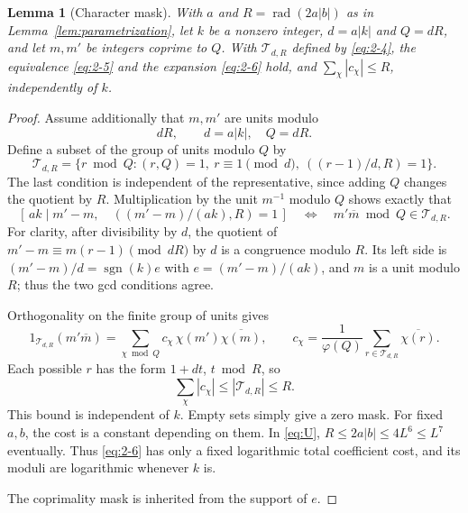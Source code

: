 \documentclass[11pt]{article}
\newtheorem{lemma}[theorem]{Lemma}
\theoremstyle{definition}
\theoremstyle{definition}
\begin{document}
\begin{lemma}[Character mask]\label{lem:mask}
With \(a\) and \(R=\operatorname{rad}(2a|b|)\) as in Lemma~\ref{lem:parametrization}, let \(k\) be a nonzero integer, \(d=a|k|\) and \(Q=dR\), and let \(m,m'\) be integers coprime to \(Q\). With \(\mathcal T_{d,R}\) defined by \eqref{eq:2-4}, the equivalence \eqref{eq:2-5} and the expansion \eqref{eq:2-6} hold, and \(\sum_\chi|c_\chi|\le R\), independently of \(k\).
\end{lemma}
\begin{proof}
Assume additionally that \(m,m'\) are units modulo
\begin{equation*}
dR,\qquad d=a|k|,\quad Q=dR.
\end{equation*}
Define a subset of the group of units modulo \(Q\) by
\begin{equation}
\mathcal T_{d,R}=
 \{r\bmod Q:(r,Q)=1,\ r\equiv1\pmod d,\
                  ((r-1)/d,R)=1\}.                    \tag{2.4}\label{eq:2-4}
\end{equation}
The last condition is independent of the representative, since adding \(Q\) changes the quotient by \(R\). Multiplication by the unit \(m^{-1}\) modulo \(Q\) shows exactly that
\stepcounter{equation}
\begin{equation}
\left[\,ak\mid m'-m,\quad
             \left((m'-m)/(ak),R\right)=1\,\right]
 \quad\Longleftrightarrow\quad
 m'\overline m\bmod Q\in\mathcal T_{d,R}.                \tag{2.5}\label{eq:2-5}
\end{equation}
For clarity, after divisibility by \(d\), the quotient of
\(m'-m\equiv m(r-1)\pmod{dR}\) by \(d\) is a congruence modulo \(R\). Its left side is \((m'-m)/d=\operatorname{sgn}(k)e\) with \(e=(m'-m)/(ak)\), and \(m\) is a unit modulo \(R\); thus the two gcd conditions agree.

Orthogonality on the finite group of units gives
\begin{equation}
1_{\mathcal T_{d,R}}(m'\overline m)
 =\sum_{\chi\bmod Q}c_\chi\,\chi(m')\overline{\chi(m)},
 \qquad
 c_\chi=\frac1{\varphi(Q)}
          \sum_{r\in\mathcal T_{d,R}}\overline{\chi(r)}.
                                                        \tag{2.6}\label{eq:2-6}
\end{equation}
Each possible \(r\) has the form \(1+dt\), \(t\bmod R\), so
\begin{equation}
\sum_\chi|c_\chi|\le|\mathcal T_{d,R}|\le R.             \tag{2.7}\label{eq:2-7}
\end{equation}
This bound is independent of \(k\). Empty sets simply give a zero mask. For fixed \(a,b\), the cost is a constant depending on them. In \eqref{eq:U}, \(R\le2a|b|\le4L^6\le L^7\) eventually. Thus \eqref{eq:2-6} has only a fixed logarithmic total coefficient cost, and its moduli are logarithmic whenever \(k\) is.

The coprimality mask is inherited from the support of \(e\).

\end{proof}
\end{document}
